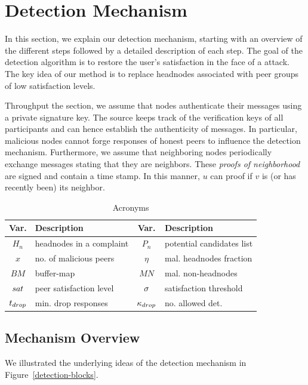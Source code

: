 \section{Detection Mechanism}
\label{sec:detection}


In this section, we explain our detection mechanism, starting with an overview of the different steps followed by a detailed description of each step.  
The goal of the detection algorithm is to restore the user's satisfaction in the face of a \drop attack. The key idea of our method is to replace headnodes associated with peer groups of low satisfaction levels. 

Throughput the section, we assume that nodes authenticate their messages using a private signature key. The source keeps track of the verification keys of all participants and can hence establish the authenticity of messages. In particular, malicious nodes cannot forge responses of honest peers to influence the detection mechanism. 
Furthermore, we assume that neighboring nodes periodically exchange messages stating that they are neighbors. These \emph{proofs of neighborhood} are signed and contain a time stamp. In this manner, $u$ can proof if $v$ is (or has recently been) its neighbor. 


\begin{table}[ht]
\center
\caption{Acronyms}
\begin{tabular}{|c|l||c|l|}
\hline

\bf{Var.} & \bf{Description}  & \bf{Var.} & \bf{Description} \\\hline\hline
$H_n$ & headnodes in a complaint & $P_n$ & potential candidates list \\\hline
$x$ & no. of malicious peers & $\eta$ & mal. headnodes fraction\\\hline
$BM$ & buffer-map & $MN$ & mal. non-headnodes \\\hline
$sat$ & peer satisfaction level & $\sigma$ & satisfaction threshold \\\hline
$t_{drop}$ & min. drop responses & $\kappa_{drop}$ & no. allowed det. \\\hline
\end{tabular}
\label{tab:acronyms}
\end{table}

\subsection{Mechanism Overview}
We illustrated the underlying ideas of the detection mechanism in Figure~\ref{detection-blocks}.

